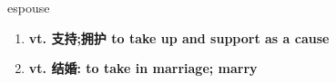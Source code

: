 
\begin{frame}
{\huge espouse}
\begin{center}
\begin{enumerate}\Large
  \item \textbf{vt. 支持;拥护 to take up and support as a cause}
  \item \textbf{vt. 结婚: to take in marriage; marry}
\end{enumerate}
\end{center}
\end{frame}
